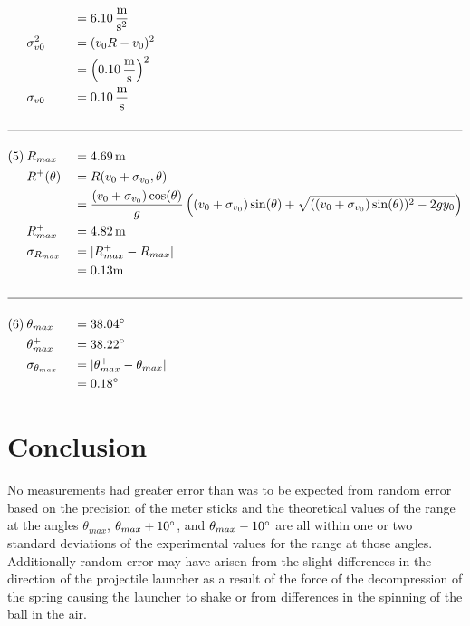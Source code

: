 \documentclass[12pt]{article}
\begin{document}
\begin{alignat*}{3}
        &&& = 6.10 \,\mathrm{\frac{m}{s^2}}\\
        &\sigma_{v0}^2 && = (v_0R-v_0)^2\\
        &&& = \left(0.10 \, \mathrm{\frac{m}{s}}\right)^2\\
        &\sigma_{v0} && = 0.10\, \mathrm{\frac{m}{s}}\\\\
        \hline\\
        (5)\>& R_{max} &&= 4.69 \, \mathrm{m}\\
        &R^+(\theta) && = R(v_0 + \sigma_{v_0}, \theta)\\
        &&& = \frac{(v_0 + \sigma_{v_0}) \cos(\theta)}{g}\left((v_0 + \sigma_{v_0}) \sin(\theta) +\sqrt{((v_0 + \sigma_{v_0}) \sin(\theta))^2-2gy_{0}}\right)\\
        &R^+_{max} && = 4.82 \, \mathrm{m}\\
        &\sigma_{R_{max}} && = | R^+_{max} - R_{max} |\\
        &&& = 0.13 \mathrm{m}\\\\
        \hline\\
        (6)\>&\theta_{max} && = 38.04 \degree\\
        &\theta^+_{max} && = 38.22 \degree\\
        &\sigma_{\theta_{max}} && = | \theta^+_{max} - \theta_{max} |\\
        &&& = 0.18 \degree
    \end{alignat*}
    \section{Conclusion}
    No measurements had greater error than was to be expected from random error based on the precision of the meter sticks and the theoretical 
    values of the range at the angles \(\theta_{max}\), \(\theta_{max}+10\degree\), and \(\theta_{max} - 10 \degree\) are all within one or two 
    standard deviations of the experimental values for the range at those angles. Additionally random error may have arisen from 
    the slight differences in the direction of the projectile launcher as a result of the force of the decompression of the 
    spring causing the launcher to shake or from differences in the spinning of the ball in the air.
\end{document}

